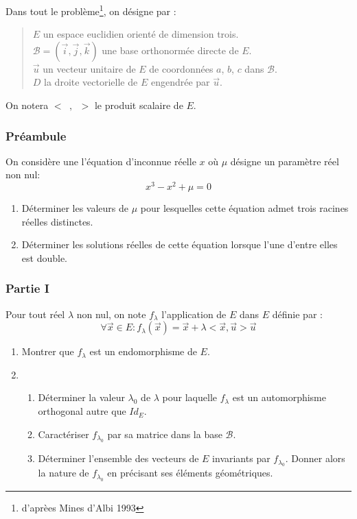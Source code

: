 Dans tout le probl{\`e}me\footnote{d'apr{\`e}es Mines d'Albi 1993}, on d{\'e}signe par :
\begin{quote}
  $E$  un espace euclidien orient{\'e} de dimension trois.\\
  $\mathcal{B}=(\overrightarrow{i},\overrightarrow{j},\overrightarrow{k})$ une base orthonorm{\'e}e directe de  $E$.\\
  $\overrightarrow{u}$ un vecteur unitaire de $E$ de coordonn{\'e}es $a$, $b$, $c$ dans $\mathcal{B}$. \\
  $D$ la droite vectorielle de $E$ engendr{\'e}e par  $\overrightarrow{u}$.
\end{quote}
On notera $<\phantom{a},\phantom{a}>$ le produit scalaire de $E$.

\subsubsection*{Pr{\'e}ambule}
On considère une l'{\'e}quation d'inconnue r{\'e}elle $x$ o{\`u} $\mu$ d{\'e}signe un param{\`e}tre r{\'e}el non nul:
\begin{displaymath}
 x^3-x^2+\mu=0
\end{displaymath}

\begin{enumerate}
  \item D{\'e}terminer les valeurs de $\mu$ pour lesquelles cette  {\'e}quation admet trois racines r{\'e}elles distinctes.
  \item D{\'e}terminer les solutions r{\'e}elles de cette {\'e}quation lorsque l'une d'entre elles est double.
\end{enumerate}

\subsubsection*{Partie I}
Pour tout r{\'e}el $\lambda$ non nul, on note $f_{\lambda}$ l'application de $E$ dans $E$ d{\'e}finie par :
\begin{displaymath}
 \forall \overrightarrow{x}\in E :
f_{\lambda}(\overrightarrow{x})=
\overrightarrow{x}+ \lambda <\overrightarrow{x},\overrightarrow{u}>\overrightarrow{u}
\end{displaymath}
\begin{enumerate}
  \item Montrer que $f_{\lambda}$ est un endomorphisme de $E$.
  \item
\begin{enumerate}
  \item D{\'e}terminer la valeur $\lambda_0$ de $\lambda$ pour laquelle  $f_\lambda$ est un automorphisme orthogonal autre que $Id_E$.
  \item Caract{\'e}riser $f_{\lambda_0}$ par sa matrice dans la base  $\mathcal{B}$.
  \item D{\'e}terminer l'ensemble des vecteurs de $E$ invariants par  $f_{\lambda_0}$. Donner alors la nature de $f_{\lambda_0}$ en pr{\'e}cisant ses {\'e}l{\'e}ments géométriques.
\end{enumerate}

\end{enumerate}

